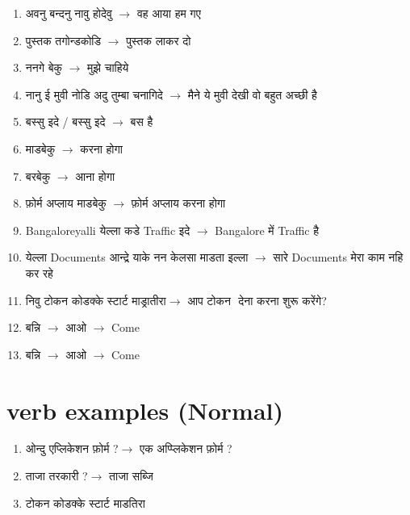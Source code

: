\documentclass{article}
\begin{document}
\begin{enumerate}
    \item {\s अवनु बन्दनु  नावु होदेवु $\longrightarrow$ वह आया  हम गए }
    \item {\s {} पुस्तक तगोन्डकोडि $\longrightarrow$  पुस्तक लाकर दो  }
    \item {\s ननगे  बेकु $\longrightarrow$ मुझे  चाहिये  }
    \item {\s नानु ई मुवी नोडि  अदु तुम्बा चनागिदे $\longrightarrow$ मैने ये मुवी देखी  वो बहुत अच्छी है}
    \item {\s बस्सु  इदे / बस्सु  इदे   } $\longrightarrow$ {\s बस  है }
    \item {\s {} माडबेकु  $\longrightarrow$  करना होगा}
    \item {\s {} बरबेकु $\longrightarrow$   आना होगा}
    \item {\s {} फ़ोर्म अप्लाय माडबेकु $\longrightarrow$   फ़ोर्म अप्लाय करना होगा }
    \item {\s Bangaloreyalli येल्ला कडे Traffic  इदे $\longrightarrow$ Bangalore में   Traffic है }
    \item {\s येल्ला Documents  आन्द्रे याके नन केलसा माडता इल्ला $\longrightarrow$  सारे Documents   मेरा काम नहि कर रहे}
    \item {\s निवु टोकन  कोडक्के स्टार्ट माड्रातीरा$\longrightarrow$ आप टोकन ​ देना करना शुरू करेंगे?}
    \item {\s {} बन्नि $\longrightarrow$  आओ $\longrightarrow$ Come }
    \item {\s {} बन्नि $\longrightarrow$  आओ $\longrightarrow$ Come }
\end{enumerate}

\section{\s  verb examples (Normal)} 

\begin{enumerate}
    \item {\s ओन्दु एप्लिकेशन फ़ोर्म ?$\longrightarrow$ एक अप्प्लिकेशन फ़ोर्म  ? }
    \item {\s ताजा तरकारी   ?$\longrightarrow$ ताजा सब्जि }
    \item {\s टोकन कोडक्के स्टार्ट माडतिरा }
\end{enumerate}
\end{document}
